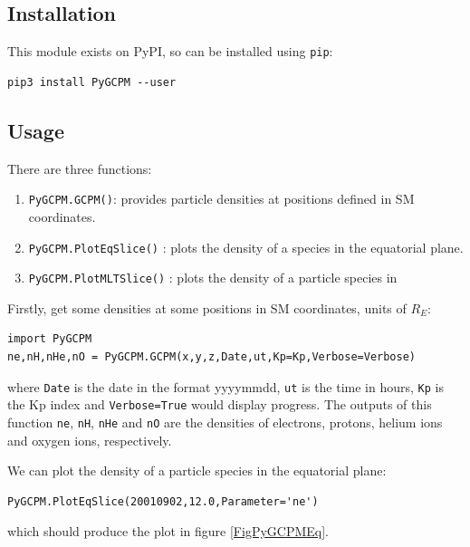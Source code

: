 		\subsection{Installation}

			This module exists on PyPI, so can be installed using \texttt{pip}:
			\begin{verbatim}
pip3 install PyGCPM --user
			\end{verbatim}

		\subsection{Usage}

			There are three functions:
			\begin{enumerate}
				\item \texttt{PyGCPM.GCPM()}: provides particle densities at positions defined in SM coordinates.
				\item \texttt{PyGCPM.PlotEqSlice()} : plots the density of a species in the equatorial plane.
				\item \texttt{PyGCPM.PlotMLTSlice()} : plots the density of a particle species in 
			\end{enumerate}

			Firstly, get some densities at some positions in SM coordinates, units of $R_E$:
			\begin{verbatim}
import PyGCPM
ne,nH,nHe,nO = PyGCPM.GCPM(x,y,z,Date,ut,Kp=Kp,Verbose=Verbose)
			\end{verbatim}
			where \texttt{Date} is the date in the format yyyymmdd, \texttt{ut} is the time in hours, \texttt{Kp} is the Kp index and \texttt{Verbose=True} would display progress. The outputs of this function \texttt{ne}, \texttt{nH}, \texttt{nHe} and \texttt{nO} are the densities of electrons, protons, helium ions and oxygen ions, respectively.

			We can plot the density of a particle species in the equatorial plane:
			\begin{verbatim}
PyGCPM.PlotEqSlice(20010902,12.0,Parameter='ne')
			\end{verbatim}
			which should produce the plot in figure \ref{FigPyGCPMEq}.


